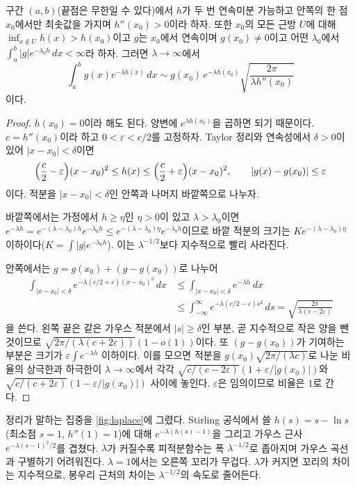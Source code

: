 \begin{theorem}[Laplace]
\label{thm:laplace}
구간 $(a,b)$(끝점은 무한일 수 있다)에서 $h$가 두 번 연속미분 가능하고 안쪽의 한 점 $x_0$에서만 최솟값을 가지며 $h''(x_0)>0$이라 하자. 또한 $x_0$의 모든 근방 $U$에 대해 $\inf_{x\notin U}h(x)>h(x_0)$이고 $g$는 $x_0$에서 연속이며 $g(x_0)\ne0$이고 어떤 $\lambda_0$에서 $\int_a^b|g|e^{-\lambda_0h}\,dx<\infty$라 하자. 그러면 $\lambda\to\infty$에서
\[
\int_a^bg(x)e^{-\lambda h(x)}\,dx\sim g(x_0)\,e^{-\lambda h(x_0)}\sqrt{\frac{2\pi}{\lambda h''(x_0)}}
\]
이다.
\end{theorem}

\begin{proof}
$h(x_0)=0$이라 해도 된다. 양변에 $e^{\lambda h(x_0)}$을 곱하면 되기 때문이다. $c=h''(x_0)$이라 하고 $0<\varepsilon<c/2$를 고정하자. Taylor 정리와 연속성에서 $\delta>0$이 있어 $|x-x_0|<\delta$이면
\[
\Bigl(\frac c2-\varepsilon\Bigr)(x-x_0)^2\le h(x)\le\Bigl(\frac c2+\varepsilon\Bigr)(x-x_0)^2,\qquad |g(x)-g(x_0)|\le\varepsilon
\]
이다. 적분을 $|x-x_0|<\delta$인 안쪽과 나머지 바깥쪽으로 나누자.

바깥쪽에서는 가정에서 $h\ge\eta$인 $\eta>0$이 있고 $\lambda>\lambda_0$이면 $e^{-\lambda h}=e^{-(\lambda-\lambda_0)h}e^{-\lambda_0h}\le e^{-(\lambda-\lambda_0)\eta}e^{-\lambda_0h}$이므로 바깥 적분의 크기는 $Ke^{-(\lambda-\lambda_0)\eta}$ 이하이다($K=\int|g|e^{-\lambda_0h}$). 이는 $\lambda^{-1/2}$보다 지수적으로 빨리 사라진다.

안쪽에서는 $g=g(x_0)+(g-g(x_0))$로 나누어
\begin{align*}
\int_{|x-x_0|<\delta}e^{-\lambda(c/2+\varepsilon)(x-x_0)^2}\,dx
&\le\int_{|x-x_0|<\delta}e^{-\lambda h}\,dx\\
&\le\int_{-\infty}^{\infty}e^{-\lambda(c/2-\varepsilon)s^2}\,ds=\sqrt{\frac{2\pi}{\lambda(c-2\varepsilon)}}
\end{align*}
을 쓴다. 왼쪽 끝은 같은 가우스 적분에서 $|s|\ge\delta$인 부분, 곧 지수적으로 작은 양을 뺀 것이므로 $\sqrt{2\pi/(\lambda(c+2\varepsilon))}(1-o(1))$이다. 또 $(g-g(x_0))$가 기여하는 부분은 크기가 $\varepsilon\int e^{-\lambda h}$ 이하이다. 이를 모으면 적분을 $g(x_0)\sqrt{2\pi/(\lambda c)}$로 나눈 비율의 상극한과 하극한이 $\lambda\to\infty$에서 각각 $\sqrt{c/(c-2\varepsilon)}(1+\varepsilon/|g(x_0)|)$와 $\sqrt{c/(c+2\varepsilon)}(1-\varepsilon/|g(x_0)|)$ 사이에 놓인다. $\varepsilon$은 임의이므로 비율은 $1$로 간다.
\end{proof}

정리가 말하는 집중을 \cref{fig:laplace}에 그렸다. Stirling 공식에서 쓸 $h(s)=s-\ln s$(최소점 $s=1$, $h''(1)=1$)에 대해 $e^{-\lambda(h(s)-1)}$을 그리고 가우스 근사 $e^{-\lambda(s-1)^2/2}$를 겹쳤다. $\lambda$가 커질수록 피적분함수는 폭 $\lambda^{-1/2}$로 좁아지며 가우스 곡선과 구별하기 어려워진다. $\lambda=1$에서는 오른쪽 꼬리가 무겁다. $\lambda$가 커지면 꼬리의 차이는 지수적으로, 봉우리 근처의 차이는 $\lambda^{-1/2}$의 속도로 줄어든다.

